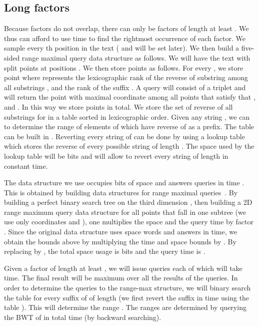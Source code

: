 \documentclass[11pt,runningheads]{llncs}
\begin{document}
{\subsection{Long factors}
\label{sec:rightmost_long_factors}

Because factors do not overlap, there can only be  factors of length at least .
We thus can afford to use time  to find the rightmost occurrence 
of each factor. We sample every th position in the text
( and  will be set later). We then build a five-sided  range maximal query data structure
as follows. We will have the text  with split points at positions 
. We then store  points as follows. 
For every , we store point  where 
 represents the lexicographic rank of the reverse of substring 
among all substrings , and  the rank of the suffix . A query will consist 
of a triplet  and will return the point
 with maximal coordinate  among all points that satisfy 
that ,  and . 
In this way we store  points in total. 
We store the set  of reverse of 
all substrings  for  
in a table  sorted in lexicographic order. 
Given any string , we can to determine the range of elements 
of  which have reverse of  as a prefix. The table  
can be built in . 
Reverting every string of  can be done by using a lookup table  which stores
the reverse of every possible string of length . The space used 
by the lookup table will be  bits and will allow to revert 
every string of length  in constant time. 


The data structure we use occupies 
bits of space and answers queries in time . 
This is obtained by building  data structures 
for  range maximal queries~\cite{farzan2012succinct}. 
By building a perfect binary search tree on the third dimension 
, then building a 2D range maximum query data structure for all points 
that fall in one subtree (we use only coordinates  and ), one 
multiplies the space and the query time by factor . 
Since the original data structure uses space  words 
and answers in  time, 
we obtain the bounds above 
by multiplying the time and space bounds by . 
By replacing  by , the total space usage is
 bits and the query time is . 

Given a factor  of length at least , we will 
issue  queries each of which will take 
 time. The final result will be maximum 
over all the results of the queries. 
In order to determine the queries 
to the  range-max structure, we will binary search 
the table  for every suffix of   of length 
(we first revert the suffix in time  
using the table ). This will determine 
the range . The ranges  are determined by querying 
the BWT of  in total time  (by backward searching). 

}
\end{document}
